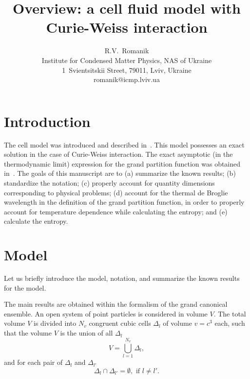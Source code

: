 \documentclass[12pt]{article}
\title{Overview: a cell fluid model with Curie-Weiss interaction}
\author{R.V.~Romanik
	\\ \small Institute for Condensed Matter Physics, NAS of Ukraine
	\\ \small 1~Svientsitskii Street, 79011, Lviv, Ukraine
	\\ \small romanik@icmp.lviv.ua}
\numberwithin{equation}{section}
\begin{document}
	
	\maketitle
	
	
	
	\tableofcontents
	
	\section{Introduction}
	The cell model was introduced and described in~\cite{KKD18,KKD20}. This model possesses an exact solution in the case of Curie-Weiss interaction. The exact asymptotic (in the thermodynamic limit) expression for the grand partition function was obtained in~\cite{KKD20}.
	The goals of this manuscript are to (a) summarize the known results; (b) standardize the notation; (c) properly account for quantity dimensions corresponding to physical problems; (d) account for the thermal de Broglie wavelength in the definition of the grand partition function, in order to properly account for temperature dependence while calculating the entropy; and (e) calculate the entropy.
	
	\section{\label{sec:model} Model}
	Let us briefly introduce the model, notation, and summarize the known results for the model.
	
	The main results are obtained within the formalism of the grand canonical ensemble. An open system of point particles is considered in volume $V$. The total volume $V$ is divided into $N_v$ congruent cubic cells $\Delta_l$ of volume $v=c^3$ each, such that the volume $V$ is the union of all $\Delta_l$
	\begin{equation*}
		V = \bigcup_{l=1}^{N_v}\Delta_l,
	\end{equation*}
	and for each pair of $\Delta_l$ and $\Delta_{l'}$
	\begin{equation*}
		\Delta_l \cap \Delta_{l'} = \emptyset, \text{ if } l \neq l'.
	\end{equation*}
	
\end{document}
